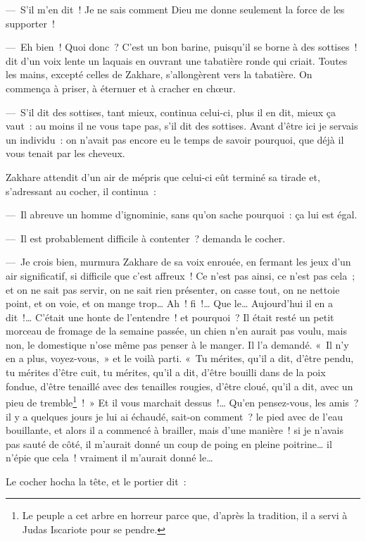 \documentclass[french,twoside]{book} %
\begin{document}
— S’il m’en dit ! Je ne sais comment Dieu me donne seulement la force de les supporter !\par
— Eh bien ! Quoi donc ? C’est un bon barine, puisqu’il se borne à des sottises ! dit d’un voix lente un laquais en ouvrant une tabatière ronde qui criait. Toutes les mains, excepté celles de Zakhare, s’allongèrent vers la tabatière. On commença à priser, à éternuer et à cracher en chœur.\par
— S’il dit des sottises, tant mieux, continua celui-ci, plus il en dit, mieux ça vaut : au moins il ne vous tape pas, s’il dit des sottises. Avant d’être ici je servais un individu : on n’avait pas encore eu le temps de savoir pourquoi, que déjà il vous tenait par les cheveux.\par
Zakhare attendit d’un air de mépris que celui-ci eût terminé sa tirade et, s’adressant au cocher, il continua :\par
— Il abreuve un homme d’ignominie, sans qu’on sache pourquoi : ça lui est égal.\par
— Il est probablement difficile à contenter ? demanda le cocher.\par
— Je crois bien, murmura Zakhare de sa voix enrouée, en fermant les jeux d’un air significatif, si difficile que c’est affreux ! Ce n’est pas ainsi, ce n’est pas cela ; et on ne sait pas servir, on ne sait rien présenter, on casse tout, on ne nettoie point, et on voie, et on mange trop… Ah ! fi !… Que le… Aujourd’hui il en a dit !… C’était une honte de l’entendre ! et pourquoi ? Il était resté un petit morceau de fromage de la semaine passée, un chien n’en aurait pas voulu, mais non, le domestique n’ose même pas penser à le manger. Il l’a demandé. « Il n’y en a plus, voyez-vous, » et le voilà parti. « Tu mérites, qu’il a dit, d’être pendu, tu mérites d’être cuit, tu mérites, qu’il a dit, d’être bouilli dans de la poix fondue, d’être tenaillé avec des tenailles rougies, d’être cloué, qu’il a dit, avec un pieu de tremble\footnote{Le peuple a cet arbre en horreur parce que, d’après la tradition, il a servi à Judas Iscariote pour se pendre.} ! » Et il vous marchait dessus !… Qu’en pensez-vous, les amis ? il y a quelques jours je lui ai échaudé, sait-on comment ? le pied avec de l’eau bouillante, et alors il a commencé à brailler, mais d’une manière ! si je n’avais pas sauté de côté, il m’aurait donné un coup de poing en pleine poitrine… il n’épie que cela ! vraiment il m’aurait donné le…\par
Le cocher hocha la tête, et le portier dit :\par
\end{document}
